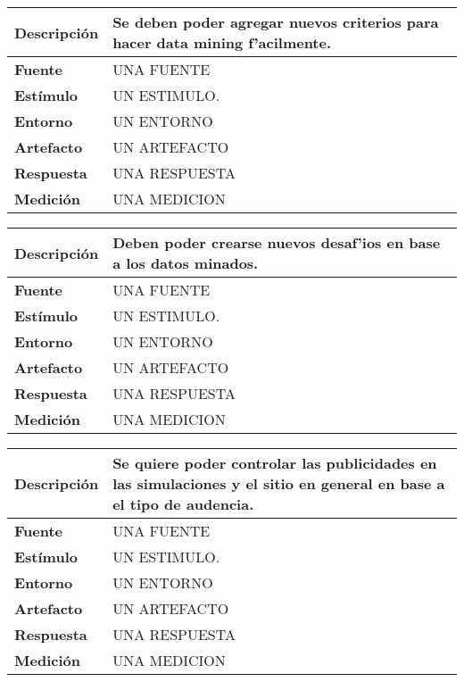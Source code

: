 \begin{center}
  \begin{tabular}{| l | p{10cm} | }
    \hline
  \textbf{Descripción} & Se deben poder agregar nuevos criterios para hacer data mining f'acilmente.\\  \hline
  \textbf{Fuente} & UNA FUENTE\\  \hline
  \textbf{Estímulo} & UN ESTIMULO.\\  \hline
  \textbf{Entorno} & UN ENTORNO\\  \hline
  \textbf{Artefacto} & UN ARTEFACTO\\  \hline
  \textbf{Respuesta} & UNA RESPUESTA\\  \hline
  \textbf{Medición} & UNA MEDICION\\  \hline
  \end{tabular}
\end{center} 
\begin{center}
  \begin{tabular}{| l | p{10cm} | }
    \hline
  \textbf{Descripción} & Deben poder crearse nuevos desaf'ios en base a los datos minados.\\  \hline
  \textbf{Fuente} & UNA FUENTE\\  \hline
  \textbf{Estímulo} & UN ESTIMULO.\\  \hline
  \textbf{Entorno} & UN ENTORNO\\  \hline
  \textbf{Artefacto} & UN ARTEFACTO\\  \hline
  \textbf{Respuesta} & UNA RESPUESTA\\  \hline
  \textbf{Medición} & UNA MEDICION\\  \hline
  \end{tabular}
\end{center} 

\begin{center}
  \begin{tabular}{| l | p{10cm} | }
    \hline
  \textbf{Descripción} & Se quiere poder controlar las publicidades en las simulaciones y el sitio en general en base a el tipo de audencia.\\  \hline
  \textbf{Fuente} & UNA FUENTE\\  \hline
  \textbf{Estímulo} & UN ESTIMULO.\\  \hline
  \textbf{Entorno} & UN ENTORNO\\  \hline
  \textbf{Artefacto} & UN ARTEFACTO\\  \hline
  \textbf{Respuesta} & UNA RESPUESTA\\  \hline
  \textbf{Medición} & UNA MEDICION\\  \hline
  \end{tabular}
\end{center} 

